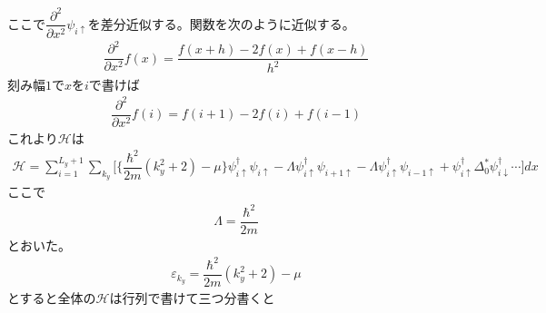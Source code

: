 \documentclass{jarticle}
\begin{document}
	ここで$\dfrac{\partial^{2}}{\partial x^2}\psi_{i\uparrow}$を差分近似する。関数を次のように近似する。
	\begin{align}
	\dfrac{\partial^{2}}{\partial x^2}f(x)=\dfrac{f(x+h)-2f(x)+f(x-h)}{h^2}
	\end{align}
	刻み幅$1$で$x$を$i$で書けば
	\begin{align}
	\dfrac{\partial^{2}}{\partial x^2}f(i)=f(i+1)-2f(i)+f(i-1)
	\end{align}
	これより$\mathcal{H}$は
	\begin{align}
	\mathcal{H}
	=\sum_{i=1}^{L_y+1}\displaystyle\sum_{k_y}\Big[\big\{\dfrac{\hbar^2}{2m}(k_y^2+2)-\mu\big\}\psi_{i\uparrow}^{\dagger}\psi_{i\uparrow}-\Lambda\psi_{i\uparrow}^{\dagger}\psi_{i+1\uparrow}-\Lambda\psi_{i\uparrow}^{\dagger}\psi_{i-1\uparrow}+\psi_{i\uparrow}^{\dagger}\Delta^{*}_0\psi_{i\downarrow}^{\dagger}\cdots\Big]dx
	\end{align}
	ここで
	\begin{align}
	\Lambda=\dfrac{\hbar^2}{2m}
	\end{align}
	とおいた。
	\begin{align}
	\varepsilon_{k_y}=\dfrac{\hbar^2}{2m}(k_y^2+2)-\mu
	\end{align}
	とすると全体の$\mathcal{H}$は行列で書けて三つ分書くと
\end{document}
